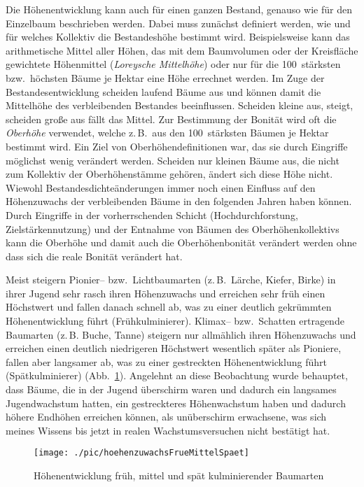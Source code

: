 \documentclass[twocolumn]{scrartcl}
\begin{document}
Die Höhenentwicklung kann auch für einen ganzen Bestand, genauso wie für den
Einzelbaum beschrieben werden. Dabei muss zunächst definiert werden, wie und für
welches Kollektiv die Bestandeshöhe bestimmt wird. Beispielsweise kann das
arithmetische Mittel aller Höhen, das mit dem Baumvolumen oder der Kreisfläche
gewichtete Höhenmittel (\emph{Loreysche Mittelhöhe}) oder nur für die
100~stärksten bzw.\ höchsten Bäume je Hektar eine Höhe errechnet werden. Im Zuge
der Bestandesentwicklung scheiden laufend Bäume aus und können damit die
Mittelhöhe des verbleibenden Bestandes beeinflussen. Scheiden kleine aus,
steigt, scheiden große aus fällt das Mittel. Zur Bestimmung der Bonität wird oft
die \emph{Oberhöhe} verwendet, welche z.\,B.\ aus den
100~stärksten Bäumen je Hektar bestimmt wird. Ein Ziel von Oberhöhendefinitionen
war, das sie durch Eingriffe möglichst wenig verändert werden. Scheiden nur
kleinen Bäume aus, die nicht zum Kollektiv der Oberhöhenstämme gehören, ändert
sich diese Höhe nicht. Wiewohl Bestandesdichteänderungen immer noch einen
Einfluss auf den Höhenzuwachs der verbleibenden Bäume in den folgenden Jahren
haben können. Durch Eingriffe in der vorherrschenden Schicht (Hochdurchforstung,
Zielstärkennutzung) und der Entnahme von Bäumen des Oberhöhenkollektivs kann die
Oberhöhe und damit auch die Oberhöhenbonität verändert werden ohne dass sich die
reale Bonität verändert hat.

Meist steigern Pionier-- bzw.\ Lichtbaumarten (z.\,B.\ Lärche, Kiefer, Birke) in
ihrer Jugend sehr rasch ihren Höhenzuwachs und erreichen sehr früh einen
Höchstwert und fallen danach schnell ab, was zu einer deutlich gekrümmten
Höhenentwicklung führt (Frühkulminierer). Klimax-- bzw.\ Schatten ertragende
Baumarten (z.\,B. Buche, Tanne) steigern nur allmählich ihren Höhenzuwachs und
erreichen einen deutlich niedrigeren Höchstwert wesentlich später als Pioniere,
fallen aber langsamer ab, was zu einer gestreckten Höhenentwicklung führt
(Spätkulminierer) (Abb.~\ref{fig:hoeheFrueMittelSpaet}). Angelehnt an diese
Beobachtung wurde behauptet, dass Bäume, die in der Jugend überschirm waren und
dadurch ein langsames Jugendwachstum hatten, ein gestreckteres Höhenwachstum
haben und dadurch höhere Endhöhen erreichen können, als unüberschirm erwachsene,
was sich meines Wissens bis jetzt in realen Wachstumsversuchen nicht bestätigt
hat.

\begin{figure}[htbp]
  \centering
  \texttt{[image: ./pic/hoehenzuwachsFrueMittelSpaet]}
  \caption{Höhenentwicklung früh, mittel und spät kulminierender Baumarten}
  \label{fig:hoeheFrueMittelSpaet}
\end{figure}
\end{document}
